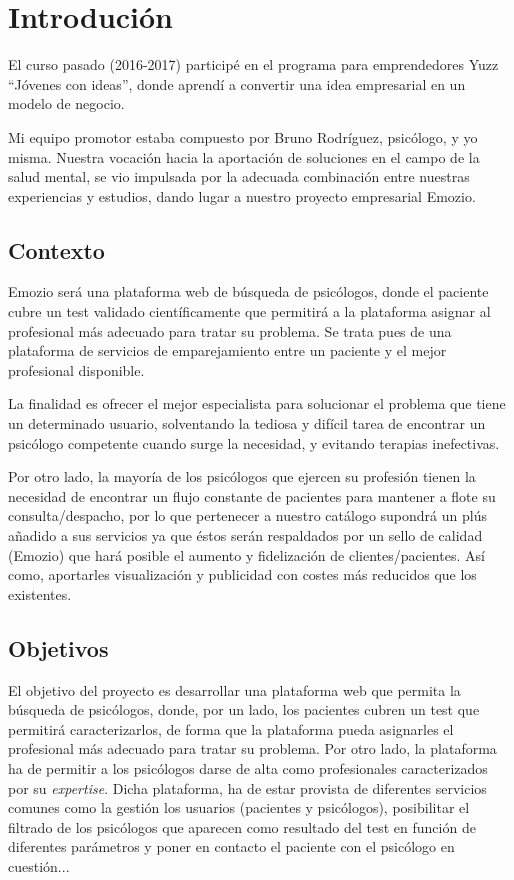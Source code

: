 \chapter{Introdución}

El curso pasado (2016-2017) participé en el programa para emprendedores Yuzz “Jóvenes con ideas”, donde aprendí a convertir una idea empresarial en un modelo de negocio. 


Mi equipo promotor estaba compuesto por Bruno Rodríguez, psicólogo, y yo misma. Nuestra vocación hacia la aportación de soluciones en el campo de la salud mental, se vio impulsada por la adecuada combinación entre nuestras experiencias y estudios, dando lugar a nuestro proyecto empresarial Emozio. 


\section{Contexto}
Emozio será una plataforma web de búsqueda de psicólogos, donde el paciente cubre un test validado científicamente que permitirá a la plataforma asignar al profesional más adecuado para tratar su problema. Se trata pues de una plataforma de servicios de emparejamiento entre un paciente y el mejor profesional disponible. 


La finalidad es ofrecer el mejor especialista para solucionar el problema que tiene un determinado usuario, solventando la tediosa y difícil tarea de encontrar un psicólogo competente cuando surge la necesidad, y evitando terapias inefectivas. 


Por otro lado, la mayoría de los psicólogos que ejercen su profesión tienen la necesidad de encontrar un flujo constante de pacientes para mantener a flote su consulta/despacho, por lo que pertenecer a nuestro catálogo supondrá un plús añadido a sus servicios ya que éstos serán respaldados por un sello de calidad (Emozio) que hará posible el aumento y fidelización de clientes/pacientes. Así como, aportarles visualización y publicidad con costes más reducidos que los existentes.


\section{Objetivos}
El objetivo del proyecto es desarrollar una plataforma web que permita la búsqueda de psicólogos, donde, por un lado, los pacientes cubren un test que permitirá caracterizarlos, de forma que la plataforma pueda asignarles el profesional más adecuado para tratar su problema. Por otro lado, la plataforma ha de permitir a los psicólogos darse de alta como profesionales caracterizados por su \textit{expertise}. Dicha plataforma, ha de estar provista de diferentes servicios comunes como la gestión los usuarios (pacientes y psicólogos), posibilitar el filtrado de los psicólogos que aparecen como resultado del test en función de diferentes parámetros y poner en contacto el paciente con el psicólogo en cuestión... 



